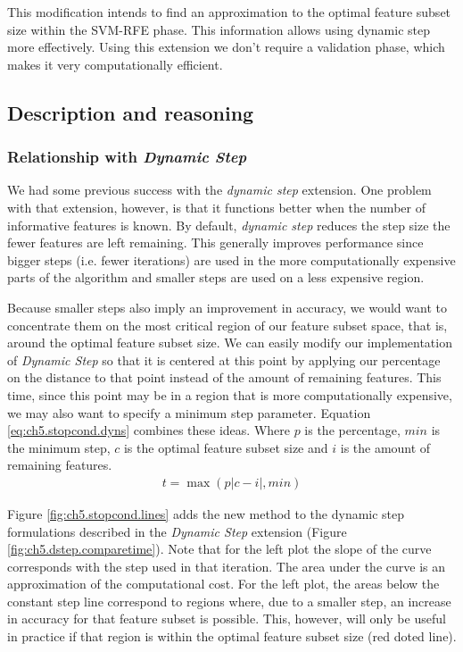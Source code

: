 This modification intends to find an approximation to the optimal feature subset size within the SVM-RFE phase. This information allows using dynamic step more effectively. Using this extension we don't require a validation phase, which makes it very computationally efficient.

\subsection{Description and reasoning}
\label{sec:ch5.stopcond.desc}

\subsubsection*{Relationship with \emph{Dynamic Step}}

We had some previous success with the \emph{dynamic step} extension. One problem with that extension, however, is that it functions better when the number of informative features is known. By default, \emph{dynamic step} reduces the step size the fewer features are left remaining. This generally improves performance since bigger steps (i.e. fewer iterations) are used in the more computationally expensive parts of the al\-go\-rithm and smaller steps are used on a less expensive region. 

Because smaller steps also imply an improvement in accuracy, we would want to concentrate them on the most critical region of our feature subset space, that is, around the optimal feature subset size. We can easily modify our implementation of \emph{Dynamic Step} so that it is centered at this point by applying our percentage on the distance to that point instead of the amount of remaining features. This time, since this point may be in a region that is more computationally expensive, we may also want to specify a minimum step parameter. Equation \ref{eq:ch5.stopcond.dyns} combines these ideas. Where $p$ is the percentage, $min$ is the minimum step, $c$ is the optimal feature subset size and $i$ is the amount of remaining features.
\begin{align}
    t = \max(p|c-i|, min)
    \label{eq:ch5.stopcond.dyns}
\end{align}

Figure \ref{fig:ch5.stopcond.lines} adds the new method to the dynamic step formulations described in the \emph{Dynamic Step} extension (Figure \ref{fig:ch5.dstep.comparetime}). Note that for the left plot the slope of the curve corresponds with the step used in that iteration. The area under the curve is an approximation of the computational cost. For the left plot, the areas below the constant step line correspond to regions where, due to a smaller step, an increase in accuracy for that feature subset is possible. This, however, will only be useful in practice if that region is within the optimal feature subset size (red doted line).

